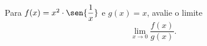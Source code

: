 \begin{frame}
  \begin{example}
    Para $f(x) = x^{2}\cdot\sen{\dfrac{1}{x}}$ e $g(x) = x$, avalie o limite
    \begin{equation*}
      \lim_{x\to 0}\frac{f(x)}{g(x)}.
    \end{equation*}
  \end{example}
\end{frame}